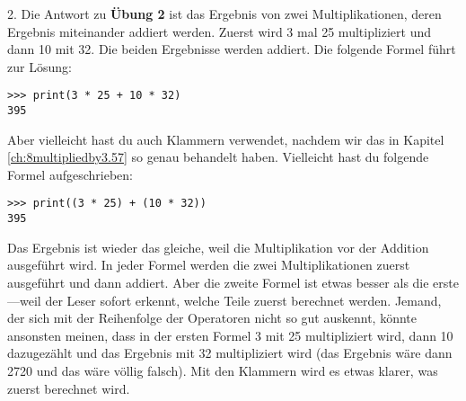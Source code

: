 \noindent
2. Die Antwort zu \textbf{Übung 2} ist das Ergebnis von zwei Multiplikationen, deren Ergebnis miteinander addiert werden. Zuerst wird 3 mal 25 multipliziert und dann 10 mit 32. Die beiden Ergebnisse werden addiert. Die folgende Formel führt zur Lösung:

\begin{listing}
\begin{verbatim}
>>> print(3 * 25 + 10 * 32)
395
\end{verbatim}
\end{listing}

\noindent
Aber vielleicht hast du auch Klammern verwendet, nachdem wir das in  Kapitel \ref{ch:8multipliedby3.57} so genau behandelt haben. Vielleicht hast du folgende Formel aufgeschrieben:

\begin{listing}
\begin{verbatim}
>>> print((3 * 25) + (10 * 32))
395
\end{verbatim}
\end{listing}

\noindent
Das Ergebnis ist wieder das gleiche, weil die Multiplikation vor der Addition ausgeführt wird. In jeder Formel werden die zwei Multiplikationen zuerst ausgeführt und dann addiert. Aber die zweite Formel ist etwas besser als die erste---weil der Leser sofort erkennt, welche Teile zuerst berechnet werden. Jemand, der sich mit der Reihenfolge der Operatoren nicht so gut auskennt, könnte ansonsten meinen, dass in der ersten Formel 3 mit 25 multipliziert wird, dann 10 dazugezählt und das Ergebnis mit 32 multipliziert wird (das Ergebnis wäre dann 2720 und das wäre völlig falsch). Mit den Klammern wird es etwas klarer, was zuerst berechnet wird.


